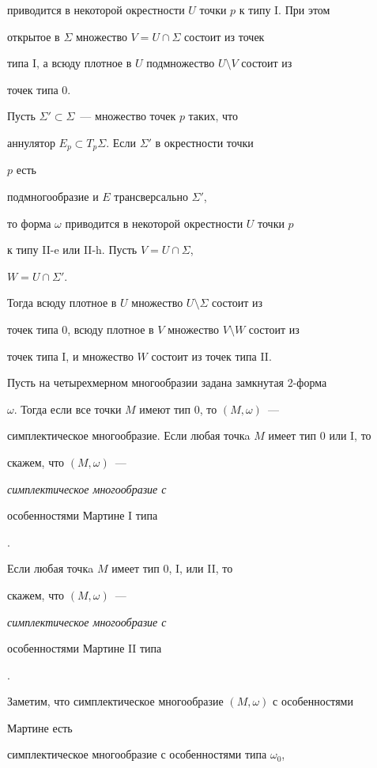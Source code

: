 приводится в некоторой окрестности $U$ точки $p$ к типу I. При этом


открытое в $\Sigma$ множество $V = U \cap \Sigma$ состоит из точек


типа I, а всюду плотное в $U$ подмножество $U \setminus V$ состоит из


точек типа 0.





Пусть $\Sigma' \subset \Sigma$~--- множество точек $p$ таких, что


аннулятор $E_p \subset T_p \Sigma$. Если $\Sigma'$ в окрестности точки


$p$ есть


подмногообразие и $E$ трансверсально $\Sigma'$,


то форма $\omega$ приводится в некоторой окрестности $U$ точки $p$


к типу II-e или II-h. Пусть $V = U \cap \Sigma$,


$W = U \cap \Sigma'$.


Тогда всюду плотное в $U$ множество $U \setminus \Sigma$ состоит из


точек типа 0, всюду плотное в $V$ множество $V \setminus W$ состоит из


точек типа I, и множество $W$ состоит из точек типа II.





Пусть на четырехмерном многообразии задана замкнутая 2-форма


$\omega$. Тогда если все точки $M$ имеют тип 0, то $(M,\omega)$~---


симплектическое многообразие. Если любая точкa $M$ имеет тип 0 или I, то


скажем, что $(M,\omega)$~--- {\em симплектическое многообразие с


особенностями Мартине $\mathrm I$ типа}.


Если любая точкa $M$ имеет тип 0, I, или II, то


скажем, что $(M,\omega)$~--- {\em симплектическое многообразие с


особенностями Мартине $\mathrm{II}$ типа}.





Заметим, что симплектическое многообразие $(M,\omega)$ с особенностями


Мартине есть


симплектическое многообразие с особенностями типа $\omega_0$,


